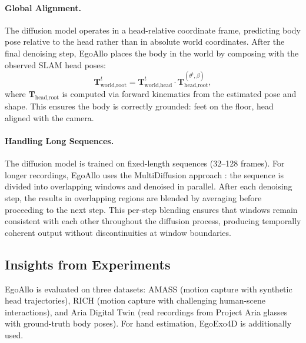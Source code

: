 \paragraph{Global Alignment.}
The diffusion model operates in a head-relative coordinate frame,
predicting body pose relative to the head rather than in absolute
world coordinates. After the final denoising step, EgoAllo places the
body in the world by composing with the observed SLAM head poses:
\begin{equation}
    \boldsymbol{T}_{\text{world},\text{root}}^t
    =
    \boldsymbol{T}_{\text{world},\text{head}}^t
    \cdot
    \boldsymbol{T}_{\text{head},\text{root}}^{(\theta^t, \beta)},
\end{equation}
where $\boldsymbol{T}_{\text{head},\text{root}}$ is computed via forward
kinematics from the estimated pose and shape. This ensures the body
is correctly grounded: feet on the floor, head aligned with the camera.

\paragraph{Handling Long Sequences.}
The diffusion model is trained on fixed-length sequences (32--128
frames). For longer recordings, EgoAllo uses the MultiDiffusion
approach \citep{bar2023multidiffusion}: the sequence is divided into
overlapping windows and denoised in parallel. After each denoising
step, the results in overlapping regions are blended by averaging
before proceeding to the next step. This per-step blending ensures
that windows remain consistent with each other throughout the
diffusion process, producing temporally coherent output without
discontinuities at window boundaries.

\subsection{Insights from Experiments}
\label{sub:egoallo_experiments}

EgoAllo is evaluated on three datasets: AMASS
\citep{mahmood2019amass} (motion capture with synthetic head
trajectories), RICH \citep{huang2022rich} (motion capture with
challenging human-scene interactions), and Aria Digital Twin
\citep{pan2023aria} (real recordings from Project Aria glasses with
ground-truth body poses). For hand estimation, EgoExo4D
\citep{grauman2023egoexo4d} is additionally used.

